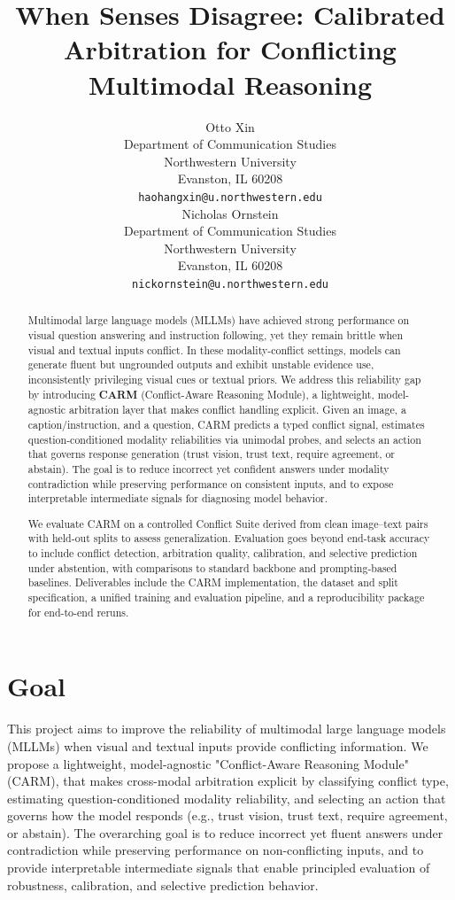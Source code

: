 \documentclass{article}
\title{When Senses Disagree: Calibrated Arbitration for Conflicting Multimodal Reasoning}
\author{%
  Otto Xin \\
  Department of Communication Studies\\
  Northwestern University\\
  Evanston, IL 60208 \\
  \texttt{haohangxin@u.northwestern.edu} \\
  \And
  Nicholas Ornstein \\
  Department of Communication Studies\\
  Northwestern University\\
  Evanston, IL 60208 \\
  \texttt{nickornstein@u.northwestern.edu}
}
\begin{document}
\maketitle

\begin{abstract} %
  Multimodal large language models (MLLMs) have achieved strong performance on visual question answering and instruction following, yet they remain brittle when visual and textual inputs conflict. In these modality-conflict settings, models can generate fluent but ungrounded outputs and exhibit unstable evidence use, inconsistently privileging visual cues or textual priors. We address this reliability gap by introducing \textbf{CARM} (Conflict-Aware Reasoning Module), a lightweight, model-agnostic arbitration layer that makes conflict handling explicit. Given an image, a caption/instruction, and a question, CARM predicts a typed conflict signal, estimates question-conditioned modality reliabilities via unimodal probes, and selects an action that governs response generation (trust vision, trust text, require agreement, or abstain). The goal is to reduce incorrect yet confident answers under modality contradiction while preserving performance on consistent inputs, and to expose interpretable intermediate signals for diagnosing model behavior.

  We evaluate CARM on a controlled Conflict Suite derived from clean image--text pairs with held-out splits to assess generalization. Evaluation goes beyond end-task accuracy to include conflict detection, arbitration quality, calibration, and selective prediction under abstention, with comparisons to standard backbone and prompting-based baselines. Deliverables include the CARM implementation, the dataset and split specification, a unified training and evaluation pipeline, and a reproducibility package for end-to-end reruns.

\end{abstract}

\section{Goal}
\label{sec:goal}

This project aims to improve the reliability of multimodal large language models (MLLMs) when visual and textual inputs provide conflicting information. We propose a lightweight, model-agnostic "Conflict-Aware Reasoning Module" (CARM), that makes cross-modal arbitration explicit by classifying conflict type, estimating question-conditioned modality reliability, and selecting an action that governs how the model responds (e.g., trust vision, trust text, require agreement, or abstain). The overarching goal is to reduce incorrect yet fluent answers under contradiction while preserving performance on non-conflicting inputs, and to provide interpretable intermediate signals that enable principled evaluation of robustness, calibration, and selective prediction behavior.
\end{document}
